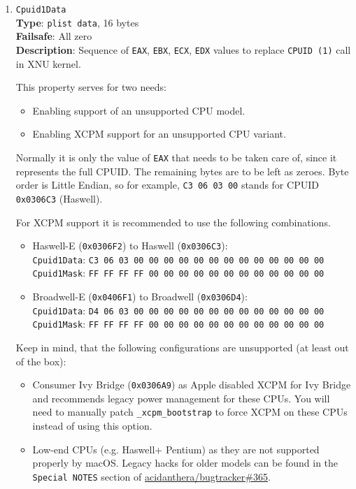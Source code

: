 \documentclass[]{article}
\providecommand{\tightlist}{%
  \setlength{\itemsep}{0pt}\setlength{\parskip}{0pt}}
\begin{document}
\begin{enumerate}
\item
  \texttt{Cpuid1Data}\\
  \textbf{Type}: \texttt{plist\ data}, 16 bytes\\
  \textbf{Failsafe}: All zero\\
  \textbf{Description}: Sequence of \texttt{EAX}, \texttt{EBX}, \texttt{ECX},
  \texttt{EDX} values to replace \texttt{CPUID (1)} call in XNU kernel.

  This property serves for two needs:

  \begin{itemize}
    \tightlist
    \item Enabling support of an unsupported CPU model.
    \item Enabling XCPM support for an unsupported CPU variant.
  \end{itemize}

  Normally it is only the value of \texttt{EAX} that needs to be taken care of,
  since it represents the full CPUID. The remaining bytes are to be left as zeroes.
  Byte order is Little Endian, so for example, \texttt{C3 06 03 00} stands for CPUID
  \texttt{0x0306C3} (Haswell).

  For XCPM support it is recommended to use the following combinations.

  \begin{itemize}
    \tightlist
    \item Haswell-E (\texttt{0x0306F2}) to Haswell (\texttt{0x0306C3}):\\
    \texttt{Cpuid1Data}: \texttt{C3 06 03 00 00 00 00 00 00 00 00 00 00 00 00 00}\\
    \texttt{Cpuid1Mask}: \texttt{FF FF FF FF 00 00 00 00 00 00 00 00 00 00 00 00}
    \item Broadwell-E (\texttt{0x0406F1}) to Broadwell (\texttt{0x0306D4}):\\
    \texttt{Cpuid1Data}: \texttt{D4 06 03 00 00 00 00 00 00 00 00 00 00 00 00 00}\\
    \texttt{Cpuid1Mask}: \texttt{FF FF FF FF 00 00 00 00 00 00 00 00 00 00 00 00}
  \end{itemize}

  Keep in mind, that the following configurations are unsupported (at least out of the box):

  \begin{itemize}
    \tightlist
    \item Consumer Ivy Bridge (\texttt{0x0306A9}) as Apple disabled XCPM for Ivy Bridge
      and recommends legacy power management for these CPUs. You will need to manually
      patch \texttt{\_xcpm\_bootstrap} to force XCPM on these CPUs instead of using this option.
    \item Low-end CPUs (e.g. Haswell+ Pentium) as they are not supported properly by macOS.
      Legacy hacks for older models can be found in the \texttt{Special NOTES} section of
      \href{https://github.com/acidanthera/bugtracker/issues/365}{acidanthera/bugtracker\#365}.
  \end{itemize}


\end{enumerate}
\end{document}
